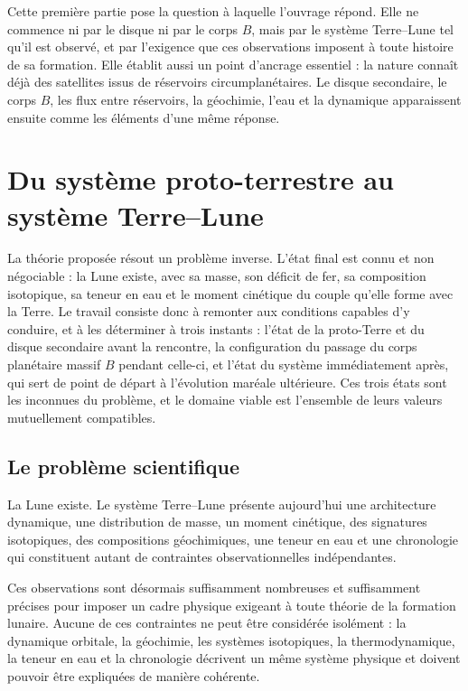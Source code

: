 \documentclass[11pt,a4paper,openany]{report}
\begin{document}
\noindent
Cette première partie pose la question à laquelle l'ouvrage répond. Elle ne commence ni par le
disque ni par le corps $B$, mais par le système Terre--Lune tel qu'il est observé, et par
l'exigence que ces observations imposent à toute histoire de sa formation. Elle établit aussi un
point d'ancrage essentiel : la nature connaît déjà des satellites issus de réservoirs
circumplanétaires. Le disque secondaire, le corps $B$, les flux entre réservoirs, la géochimie,
l'eau et la dynamique apparaissent ensuite comme les éléments d'une même réponse.

\chapter{Du système proto-terrestre au système Terre--Lune}

La théorie proposée résout un problème inverse. L'état final est connu et non négociable : la Lune
existe, avec sa masse, son déficit de fer, sa composition isotopique, sa teneur en eau et le moment
cinétique du couple qu'elle forme avec la Terre. Le travail consiste donc à remonter aux conditions
capables d'y conduire, et à les déterminer à trois instants : l'état de la proto-Terre et du disque
secondaire avant la rencontre, la configuration du passage du corps planétaire massif $B$ pendant
celle-ci, et l'état du système immédiatement après, qui sert de point de départ à l'évolution
maréale ultérieure. Ces trois états sont les inconnues du problème, et le domaine viable est
l'ensemble de leurs valeurs mutuellement compatibles.
\label{ch:probleme}

\section{Le problème scientifique}

La Lune existe. Le système Terre--Lune présente aujourd'hui une architecture dynamique, une
distribution de masse, un moment cinétique, des signatures isotopiques, des compositions
géochimiques, une teneur en eau et une chronologie qui constituent autant de contraintes
observationnelles indépendantes.

Ces observations sont désormais suffisamment nombreuses et suffisamment précises pour
imposer un cadre physique exigeant à toute théorie de la formation lunaire. Aucune de ces
contraintes ne peut être considérée isolément : la dynamique orbitale, la géochimie, les
systèmes isotopiques, la thermodynamique, la teneur en eau et la chronologie décrivent un même
système physique et doivent pouvoir être expliquées de manière cohérente.
\end{document}
